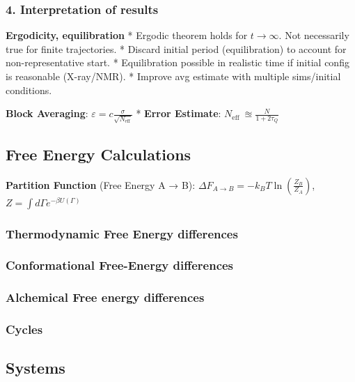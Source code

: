 \documentclass{article}
\begin{document}
\subsubsection{4. Interpretation of results}\label{interpretation-of-results} 

\textbf{Ergodicity, equilibration} * Ergodic theorem holds for \(t \rightarrow \infty\). Not necessarily true for finite trajectories. * Discard initial period (equilibration) to account for non-representative start. * Equilibration possible in realistic time if initial config is reasonable (X-ray/NMR). * Improve avg estimate with multiple sims/initial conditions.

\textbf{Block Averaging}: \(\varepsilon = c\frac{\sigma}{\sqrt{N_{\text{eff}}}}\) * \textbf{Error Estimate}: \(N_{\text{eff }} \approxeq \frac{N}{1 + 2\tau_{Q}}\)

\subsection{Free Energy Calculations}\label{free-energy-calculations}  \textbf{Partition Function} (Free Energy A → B): \(\Delta F_{A \rightarrow B} = - k_{B}T\ln(\frac{Z_{B}}{Z_{A}})\), \(Z = \int d\Gamma e^{- \beta U(\Gamma)}\) 

 \subsubsection{Thermodynamic Free Energy differences}\label{thermodynamic-free-energy-differences}    

\subsubsection{Conformational Free-Energy differences}\label{conformational-free-energy-differences}      

\subsubsection{Alchemical Free energy differences}\label{alchemical-free-energy-differences}          

\subsubsection{Cycles}       \subsection{Systems}\label{systems}  
\end{document}
